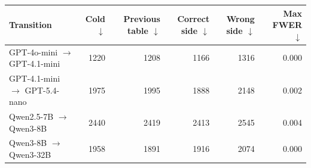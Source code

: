 \begin{tabular}{lrrrrr}
\toprule
Transition & Cold $\downarrow$ & Previous table $\downarrow$ & Correct side $\downarrow$ & Wrong side $\downarrow$ & Max FWER $\downarrow$ \\
\midrule
GPT-4o-mini $\to$ GPT-4.1-mini & 1220 & 1208 & 1166 & 1316 & 0.000 \\
GPT-4.1-mini $\to$ GPT-5.4-nano & 1975 & 1995 & 1888 & 2148 & 0.002 \\
Qwen2.5-7B $\to$ Qwen3-8B & 2440 & 2419 & 2413 & 2545 & 0.004 \\
Qwen3-8B $\to$ Qwen3-32B & 1958 & 1891 & 1916 & 2074 & 0.000 \\
\bottomrule
\end{tabular}
